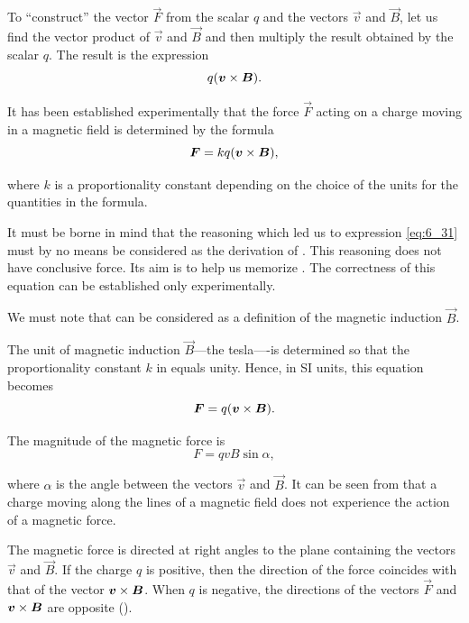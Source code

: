 To ``construct'' the vector $\vec{F}$ from the scalar $q$ and the vectors $\vec{v}$ and $\vec{B}$, let us find the vector product of $\vec{v}$ and $\vec{B}$ and then multiply the result obtained by the scalar $q$. The result is the expression
\begin{equation}\label{eq:6_31}
    q (\boldsymbol{v}\times\boldsymbol{B}).
\end{equation}

It has been established experimentally that the force $\vec{F}$ acting on a charge moving in a magnetic field is determined by the formula
\begin{equation}\label{eq:6_32}
    \boldsymbol{F} = k q (\boldsymbol{v}\times\boldsymbol{B}),
\end{equation}

\noindent
where $k$ is a proportionality constant depending on the choice of the units for the quantities in the formula.

It must be borne in mind that the reasoning which led us to expression \eqref{eq:6_31} must by no means be considered as the derivation of . This reasoning does not have conclusive force. Its aim is to help us memorize . The correctness of this equation can be established only experimentally.

We must note that  can be considered as a definition of the magnetic induction $\vec{B}$.

The unit of magnetic induction $\vec{B}$---the tesla----is determined so that the proportionality constant $k$ in  equals unity. Hence, in SI units, this equation becomes
\begin{equation}\label{eq:6_33}
    \boldsymbol{F} = q (\boldsymbol{v}\times\boldsymbol{B}).
\end{equation}

The magnitude of the magnetic force is
\begin{equation}\label{eq:6_34}
    F = q v B \sin\alpha,
\end{equation}

\noindent
where $\alpha$ is the angle between the vectors $\vec{v}$ and $\vec{B}$. It can be seen from  that a charge moving along the lines of a magnetic field does not experience the action of a magnetic force.

The magnetic force is directed at right angles to the plane containing the vectors $\vec{v}$ and $\vec{B}$. If the charge $q$ is positive, then the direction of the force coincides with that of the vector $\boldsymbol{v}\times\boldsymbol{B}$. When $q$ is negative, the directions of the vectors $\vec{F}$ and $\boldsymbol{v}\times\boldsymbol{B}$ are opposite ().

